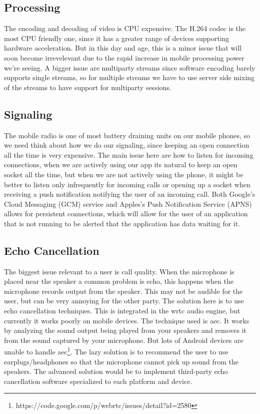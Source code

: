 \subsection{Processing}
The encoding and decoding of video is CPU expensive. The H.264 codec is the most CPU friendly one, since it has a greater range of devices supporting hardware acceleration. But in this day and age, this is a minor issue that will soon become irrevelevant due to the rapid increase in mobile processing power we're seeing. A bigger issue are multiparty streams since software encoding barely supports single streams, so for multiple streams we have to use server side mixing of the streams to have support for multiparty sessions.


\subsection{Signaling}
The mobile radio is one of most battery draining units on our mobile phones, so we need think about how we do our signaling, since keeping an open connection all the time is very expensive. The main issue here are how to listen for incoming connections, when we are actively using our app its natural to keep an open socket all the time, but when we are not actively using the phone, it might be better to listen only infrequently for incoming calls or opening up a socket when receiving a push notification notifying the user of an incoming call. Both Google's Cloud Messaging (GCM) service and Apples's Push Notification Service (APNS) allows for persistent connections, which will allow for the user of an application that is not running to be alerted that the application has data waiting for it.


\subsection{Echo Cancellation}
The biggest issue relevant to a user is call quality. When the microphone is placed near the speaker a common problem is echo, this happens when the microphone records output from the speaker. This may not be audible for the user, but can be very annoying for the other party. The solution here is to use echo cancellation techniques. This is integrated in the \gls{wrtc} audio engine, but currently it works poorly on mobile devices. The technique used is \gls{aec}. It works by analyzing the sound output being played from your speakers and removes it from the sound captured by your microphone. But lots of Android devices are unable to handle \gls{aec}\footnote{https://code.google.com/p/webrtc/issues/detail?id=2580}. The lazy solution is to recommend the user to use earplugs/headphones so that the microphone cannot pick up sound from the speakers. The advanced solution would be to implement third-party echo cancellation software specialized to each platform and device.


